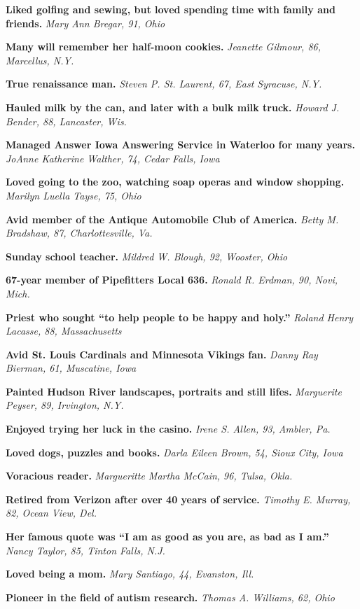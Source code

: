 \textbf{Liked golfing and sewing, but loved spending time with family
and friends.} \emph{Mary Ann Bregar, 91, Ohio}

\textbf{Many will remember her half-moon cookies.} \emph{Jeanette
Gilmour, 86, Marcellus, N.Y.}

\textbf{True renaissance man.} \emph{Steven P. St. Laurent, 67, East
Syracuse, N.Y.}

\textbf{Hauled milk by the can, and later with a bulk milk truck.}
\emph{Howard J. Bender, 88, Lancaster, Wis.}

\textbf{Managed Answer Iowa Answering Service in Waterloo for many
years.} \emph{JoAnne Katherine Walther, 74, Cedar Falls, Iowa}

\textbf{Loved going to the zoo, watching soap operas and window
shopping.} \emph{Marilyn Luella Tayse, 75, Ohio}

\textbf{Avid member of the Antique Automobile Club of America.}
\emph{Betty M. Bradshaw, 87, Charlottesville, Va.}

\textbf{Sunday school teacher.} \emph{Mildred W. Blough, 92, Wooster,
Ohio}

\textbf{67-year member of Pipefitters Local 636.} \emph{Ronald R.
Erdman, 90, Novi, Mich.}

\textbf{Priest who sought ``to help people to be happy and holy.''}
\emph{Roland Henry Lacasse, 88, Massachusetts}

\textbf{Avid St. Louis Cardinals and Minnesota Vikings fan.} \emph{Danny
Ray Bierman, 61, Muscatine, Iowa}

\textbf{Painted Hudson River landscapes, portraits and still lifes.}
\emph{Marguerite Peyser, 89, Irvington, N.Y.}

\textbf{Enjoyed trying her luck in the casino.} \emph{Irene S. Allen,
93, Ambler, Pa.}

\textbf{Loved dogs, puzzles and books.} \emph{Darla Eileen Brown, 54,
Sioux City, Iowa}

\textbf{Voracious reader.} \emph{Margueritte Martha McCain, 96, Tulsa,
Okla.}

\textbf{Retired from Verizon after over 40 years of service.}
\emph{Timothy E. Murray, 82, Ocean View, Del.}

\textbf{Her famous quote was ``I am as good as you are, as bad as I
am.''} \emph{Nancy Taylor, 85, Tinton Falls, N.J.}

\textbf{Loved being a mom.} \emph{Mary Santiago, 44, Evanston, Ill.}

\textbf{Pioneer in the field of autism research.} \emph{Thomas A.
Williams, 62, Ohio}

